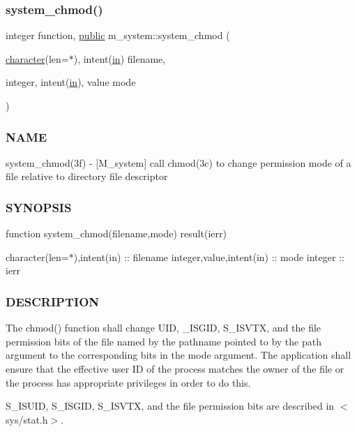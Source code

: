 \subsubsection{\texorpdfstring{system\+\_\+chmod()}{system\_chmod()}}
{\footnotesize\ttfamily integer function, \hyperlink{M__stopwatch_83_8txt_a2f74811300c361e53b430611a7d1769f}{public} m\+\_\+system\+::system\+\_\+chmod (\begin{DoxyParamCaption}\item[{\hyperlink{option__stopwatch_83_8txt_abd4b21fbbd175834027b5224bfe97e66}{character}(len=$\ast$), intent(\hyperlink{M__journal_83_8txt_afce72651d1eed785a2132bee863b2f38}{in})}]{filename,  }\item[{integer, intent(\hyperlink{M__journal_83_8txt_afce72651d1eed785a2132bee863b2f38}{in}), value}]{mode }\end{DoxyParamCaption})}



\subsubsection*{N\+A\+ME}

system\+\_\+chmod(3f) -\/ \mbox{[}M\+\_\+system\mbox{]} call chmod(3c) to change permission mode of a file relative to directory file descriptor \subsubsection*{S\+Y\+N\+O\+P\+S\+IS}

function system\+\_\+chmod(filename,mode) result(ierr)

character(len=$\ast$),intent(in) \+:\+: filename integer,value,intent(in) \+:\+: mode integer \+:\+: ierr

\subsubsection*{D\+E\+S\+C\+R\+I\+P\+T\+I\+ON}

The chmod() function shall change U\+ID, \+\_\+\+I\+S\+G\+ID, S\+\_\+\+I\+S\+V\+TX, and the file permission bits of the file named by the pathname pointed to by the path argument to the corresponding bits in the mode argument. The application shall ensure that the effective user ID of the process matches the owner of the file or the process has appropriate privileges in order to do this.

S\+\_\+\+I\+S\+U\+ID, S\+\_\+\+I\+S\+G\+ID, S\+\_\+\+I\+S\+V\+TX, and the file permission bits are described in $<$sys/stat.\+h$>$.

